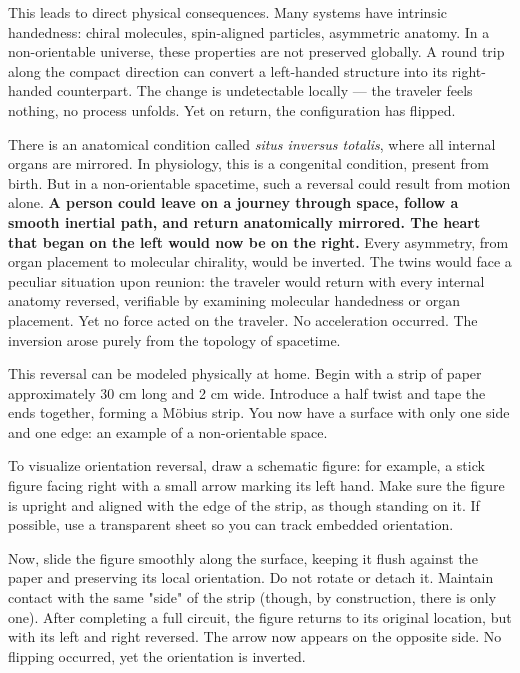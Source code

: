 This leads to direct physical consequences. Many systems have intrinsic handedness: chiral molecules, spin-aligned particles, asymmetric anatomy. In a non-orientable universe, these properties are not preserved globally. A round trip along the compact direction can convert a left-handed structure into its right-handed counterpart. The change is undetectable locally — the traveler feels nothing, no process unfolds. Yet on return, the configuration has flipped.

There is an anatomical condition called \textit{situs inversus totalis}, where all internal organs are mirrored. In physiology, this is a congenital condition, present from birth. But in a non-orientable spacetime, such a reversal could result from motion alone. \textbf{A person could leave on a journey through space, follow a smooth inertial path, and return anatomically mirrored. The heart that began on the left would now be on the right.} Every asymmetry, from organ placement to molecular chirality, would be inverted. The twins would face a peculiar situation upon reunion: the traveler would return with every internal anatomy reversed, verifiable by examining molecular handedness or organ placement. Yet no force acted on the traveler. No acceleration occurred. The inversion arose purely from the topology of spacetime.

\begin{commentary}
This reversal can be modeled physically at home. Begin with a strip of paper approximately 30 cm long and 2 cm wide. Introduce a half twist and tape the ends together, forming a Möbius strip. You now have a surface with only one side and one edge: an example of a non-orientable space.

To visualize orientation reversal, draw a schematic figure: for example, a stick figure facing right with a small arrow marking its left hand. Make sure the figure is upright and aligned with the edge of the strip, as though standing on it. If possible, use a transparent sheet so you can track embedded orientation.

Now, slide the figure smoothly along the surface, keeping it flush against the paper and preserving its local orientation. Do not rotate or detach it. Maintain contact with the same "side" of the strip (though, by construction, there is only one). After completing a full circuit, the figure returns to its original location, but with its left and right reversed. The arrow now appears on the opposite side. No flipping occurred, yet the orientation is inverted.
\end{commentary}